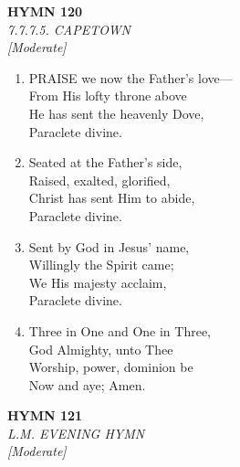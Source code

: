 \documentclass[11pt,a4paper]{article}
\begin{document}
\newpage
\begin{center}
    {\Large \textbf{HYMN 120}}
    \\
    \textit{7.7.7.5. CAPETOWN}
    \\
    \textit{\small [Moderate]}
\end{center}
\vspace{1em}

\begin{enumerate}
    \item PRAISE we now the Father's love--- \\
        From His lofty throne above \\
        He has sent the heavenly Dove, \\
        Paraclete divine.

    \item Seated at the Father's side, \\
        Raised, exalted, glorified, \\
        Christ has sent Him to abide, \\
        Paraclete divine.

    \item Sent by God in Jesus' name, \\
        Willingly the Spirit came; \\
        We His majesty acclaim, \\
        Paraclete divine.

    \item Three in One and One in Three, \\
        God Almighty, unto Thee \\
        Worship, power, dominion be \\
        Now and aye; Amen.

\end{enumerate}

\newpage
\begin{center}
    {\Large \textbf{HYMN 121}}
    \\
    \textit{L.M. EVENING HYMN}
    \\
    \textit{\small [Moderate]}
\end{center}
\vspace{1em}
\end{document}
